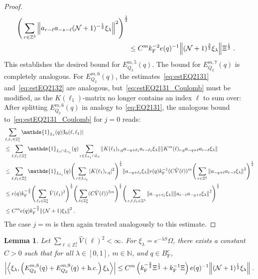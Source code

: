 \documentclass[12pt,a4paper]{article}
\numberwithin{equation}{section}
\newcommand{\NNN}{\mathbb{N}}
\newcommand{\1}{\mathbb{I}}
\newcommand{\F}{\mathrm{F}}
\newcommand{\I}{\mathrm{I}}
\newcommand{\Z}{\mathbb{Z}}
\newcommand{\NN}{\mathcal{N}}
\newcommand{\half}{\frac{1}{2}}
\newcommand{\eva}[1]{\left\langle #1 \right\rangle}
\theoremstyle{plain}
\newtheorem{lemma}[theorem]{Lemma}
\theoremstyle{definition}
\theoremstyle{remark}
\theoremstyle{plain}
\theoremstyle{definition}
\theoremstyle{remark}
\begin{document}
\begin{proof}
\begin{align}
		\Bigg( \sum_{r \in \Z^3} \norm{a_{r-\ell} a_{-s-\ell} (\NN+1)^{-\half} \xi_\lambda }^2 \Bigg)^{\half} \nonumber\\
	&\leq C^m k_{\F}^{-2} e(q)^{-1}
		\norm{(\NN+1)^{\frac 32} \xi_\lambda} \Xi^{\half} \;. \label{eq:estEQ2132}
\end{align} 
This establishes the desired bound for $ E^{m,5}_{Q_2}(q) $. The bound for $ E^{m,7}_{Q_2}(q) $ is completely analogous. For $ E^{m,6}_{Q_2}(q) $, the estimates~\eqref{eq:estEQ2131} and~\eqref{eq:estEQ2132} are analogous, but~\eqref{eq:estEQ2131_Coulomb} must be modified, as the $ K(\ell_1) $-matrix no longer contains an index $ \ell $ to sum over: After splitting $ E^{m,6}_{Q_2}(q) $ in analogy to~\eqref{eq:EQ2131}, the analogous bound to~\eqref{eq:estEQ2131_Coulomb} for $ j = 0 $ reads:
\begin{align}
	&\sum_{\ell,\ell_1 \in \Z^3_*} \mathds{1}_{L_\ell}(q) |\I_0(\ell, \ell_1)| \nonumber\\
	&\leq \sum_{\ell,\ell_1 \in \Z^3_*} \mathds{1}_{L_\ell \cap L_{\ell_1}}(q) \sum\limits_{r\in L_{\ell_1} \cap L_\ell}
		\norm{ K(\ell_1)_{r,q} a_{-q+\ell_1} a_{r-\ell_1} \xi_\lambda}
		\norm{ K^m(\ell)_{r,q} a_{-q+\ell}a_{r-\ell} \xi_\lambda } \nonumber\\
	&\leq \sum_{\ell,\ell_1 \in \Z^3_*} \mathds{1}_{L_{\ell_1}}(q) 
		\Bigg( \sum_{r\in L_{\ell_1}} |K(\ell_1)_{r,q}|^2 \Bigg)^{\half}
		\norm{  a_{-q+\ell_1} \xi_\lambda}
		e(q) k_{\F}^{-1} (C \hat{V}(\ell))^m 
	\Bigg( \sum_{r\in \Z^3} \norm{a_{-q+\ell}a_{r-\ell} \xi_\lambda }^2 \Bigg)^{\half} \nonumber\\
	&\leq e(q) k_{\F}^{-\frac 32}
		\Bigg( \sum_{\ell_1 \in \Z^3_*} \hat{V}(\ell_1)^2 \Bigg)^{\half}
		\Bigg( \sum_{\ell \in \Z^3_*} (C \hat{V}(\ell))^{2m} \Bigg)^{\half}
		\Bigg( \sum_{r, \ell, \ell_1 \in \Z^3} \norm{ a_{-q+\ell_1} \xi_\lambda}
		\norm{a_{r-\ell} a_{-q+\ell} \xi_\lambda }^2 \Bigg)^{\half} \nonumber\\
	&\leq C^m e(q) k_{\F}^{-\frac 32}
		\norm{(\NN+1) \xi_\lambda }^2
		\;. \label{eq:estEQ2131_Coulomb_bis}
\end{align}
The case $ j = m $ is then again treated analogously to this estimate.
\end{proof}


\begin{lemma} \label{lem:EQ218}
Let $ \sum_{\ell \in \Z^3_*} \hat{V}(\ell)^2 < \infty $. For $\xi_\lambda = e^{-\lambda S} \Omega$, there exists a constant $ C > 0 $ such that for all $ \lambda \in [0,1] $, $ m \in \NNN $, and $ q \in B_{\F}^c $,
\begin{align}
	\abs{\eva{\xi_\lambda,\left(E^{m,8}_{Q_2}(q) + E^{m,9}_{Q_2}(q) + \mathrm{h.c.}\right) \xi_\lambda }}
	\leq C^m \left( k_{\F}^{-\frac 32} \Xi^\half
		+ k_{\F}^{-1} \Xi \right)
		e(q)^{-1} \norm{(\NN+1)^{\half} \xi_\lambda} \;.\label{eq:estEQ218}
\end{align}
\end{lemma}
\end{document}
